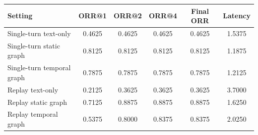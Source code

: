 \begin{tabular}{lccccc}
\toprule
Setting & ORR@1 & ORR@2 & ORR@4 & Final ORR & Latency \\
\midrule
Single-turn text-only & 0.4625 & 0.4625 & 0.4625 & 0.4625 & 1.5375 \\
Single-turn static graph & 0.8125 & 0.8125 & 0.8125 & 0.8125 & 1.1875 \\
Single-turn temporal graph & 0.7875 & 0.7875 & 0.7875 & 0.7875 & 1.2125 \\
\midrule
Replay text-only & 0.2125 & 0.3625 & 0.3625 & 0.3625 & 3.7000 \\
Replay static graph & 0.7125 & 0.8875 & 0.8875 & 0.8875 & 1.6250 \\
Replay temporal graph & 0.5375 & 0.8000 & 0.8375 & 0.8375 & 2.0250 \\
\bottomrule
\end{tabular}
